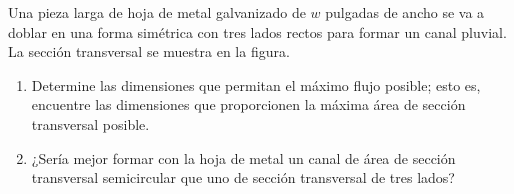 \item Una pieza larga de hoja de metal galvanizado de $w$ pulgadas de ancho se va a doblar en una forma simétrica con tres lados rectos para formar un canal pluvial. La sección transversal se muestra en la figura.
    \begin{enumerate}
        \item[(a)] Determine las dimensiones que permitan el máximo flujo posible; esto es, encuentre las dimensiones que proporcionen la máxima área de sección transversal posible.
        \item[(b)] ¿Sería mejor formar con la hoja de metal un canal de área de sección transversal semicircular que uno de sección transversal de tres lados?
    \end{enumerate}

    \begin{center}
    \end{center}
